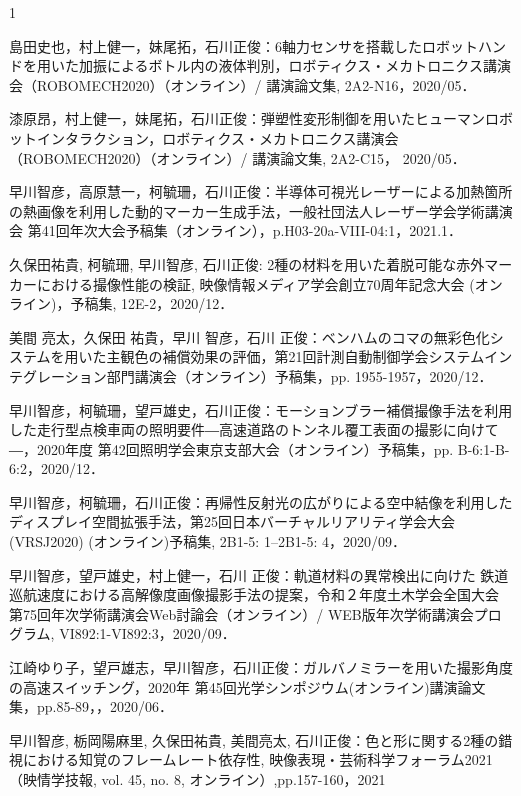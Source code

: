 \begin{発表}{1}

島田史也，村上健一，妹尾拓，石川正俊：6軸力センサを搭載したロボットハンドを用いた加振によるボトル内の液体判別，ロボティクス・メカトロニクス講演会（ROBOMECH2020）（オンライン）/ 講演論文集, 2A2-N16，2020/05．

漆原昂，村上健一，妹尾拓，石川正俊：弾塑性変形制御を用いたヒューマンロボットインタラクション，ロボティクス・メカトロニクス講演会（ROBOMECH2020）（オンライン）/ 講演論文集, 2A2-C15， 2020/05．

早川智彦，高原慧一，柯毓珊，石川正俊：半導体可視光レーザーによる加熱箇所の熱画像を利用した動的マーカー生成手法，一般社団法人レーザー学会学術講演会 第41回年次大会予稿集（オンライン），p.H03-20a-VIII-04:1，2021.1．

久保田祐貴, 柯毓珊, 早川智彦, 石川正俊: 2種の材料を用いた着脱可能な赤外マーカーにおける撮像性能の検証, 映像情報メディア学会創立70周年記念大会 (オンライン)，予稿集, 12E-2，2020/12．

美間 亮太，久保田 祐貴，早川 智彦，石川 正俊：ベンハムのコマの無彩色化システムを用いた主観色の補償効果の評価，第21回計測自動制御学会システムインテグレーション部門講演会（オンライン）予稿集，pp. 1955-1957，2020/12．

早川智彦，柯毓珊，望戸雄史，石川正俊：モーションブラー補償撮像手法を利用した走行型点検車両の照明要件―高速道路のトンネル覆工表面の撮影に向けて―，2020年度 第42回照明学会東京支部大会（オンライン）予稿集，pp. B-6:1-B-6:2，2020/12．

早川智彦，柯毓珊，石川正俊：再帰性反射光の広がりによる空中結像を利用したディスプレイ空間拡張手法，第25回日本バーチャルリアリティ学会大会 (VRSJ2020) (オンライン)予稿集, 2B1-5: 1--2B1-5: 4，2020/09．

早川智彦，望戸雄史，村上健一，石川 正俊：軌道材料の異常検出に向けた 鉄道巡航速度における高解像度画像撮影手法の提案，令和２年度土木学会全国大会 第75回年次学術講演会Web討論会（オンライン）/ WEB版年次学術講演会プログラム, VI892:1-VI892:3，2020/09．

江崎ゆり子，望戸雄志，早川智彦，石川正俊：ガルバノミラーを用いた撮影角度の高速スイッチング，2020年 第45回光学シンポジウム(オンライン)講演論文集，pp.85-89，，2020/06．

早川智彦, 栃岡陽麻里, 久保田祐貴, 美間亮太, 石川正俊：色と形に関する2種の錯視における知覚のフレームレート依存性, 映像表現・芸術科学フォーラム2021（映情学技報, vol. 45, no. 8, オンライン）,pp.157-160，2021


\end{発表}
